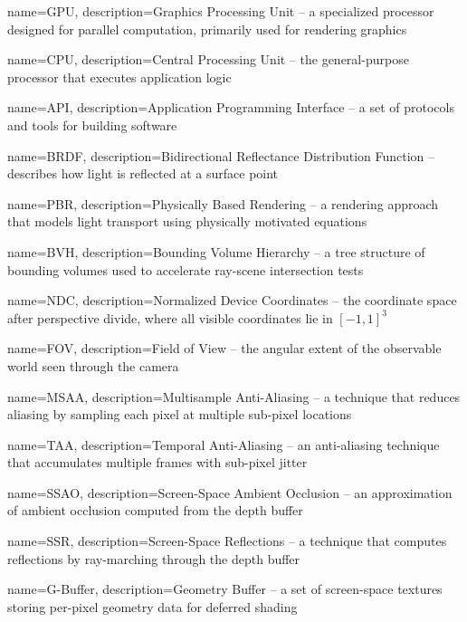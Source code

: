 {
    name=GPU,
    description={Graphics Processing Unit -- a specialized processor designed for parallel computation, primarily used for rendering graphics}
}

{
    name=CPU,
    description={Central Processing Unit -- the general-purpose processor that executes application logic}
}

{
    name=API,
    description={Application Programming Interface -- a set of protocols and tools for building software}
}

{
    name=BRDF,
    description={Bidirectional Reflectance Distribution Function -- describes how light is reflected at a surface point}
}

{
    name=PBR,
    description={Physically Based Rendering -- a rendering approach that models light transport using physically motivated equations}
}

{
    name=BVH,
    description={Bounding Volume Hierarchy -- a tree structure of bounding volumes used to accelerate ray-scene intersection tests}
}

{
    name=NDC,
    description={Normalized Device Coordinates -- the coordinate space after perspective divide, where all visible coordinates lie in $[-1, 1]^3$}
}

{
    name=FOV,
    description={Field of View -- the angular extent of the observable world seen through the camera}
}

{
    name=MSAA,
    description={Multisample Anti-Aliasing -- a technique that reduces aliasing by sampling each pixel at multiple sub-pixel locations}
}

{
    name=TAA,
    description={Temporal Anti-Aliasing -- an anti-aliasing technique that accumulates multiple frames with sub-pixel jitter}
}

{
    name=SSAO,
    description={Screen-Space Ambient Occlusion -- an approximation of ambient occlusion computed from the depth buffer}
}

{
    name=SSR,
    description={Screen-Space Reflections -- a technique that computes reflections by ray-marching through the depth buffer}
}

{
    name=G-Buffer,
    description={Geometry Buffer -- a set of screen-space textures storing per-pixel geometry data for deferred shading}
}

